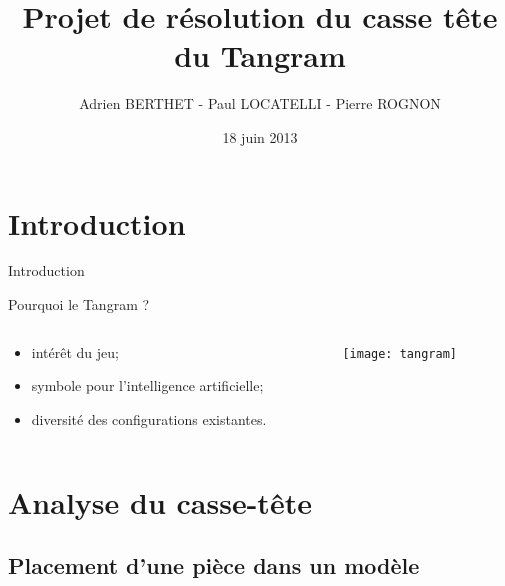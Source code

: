 \documentclass{beamer}
\title[Tangram]{Projet de résolution du casse tête du Tangram}
\author[]{Adrien BERTHET - Paul LOCATELLI - Pierre ROGNON}
\institute[UTBM]{Université de Technologies de Belfort-Montbéliard}
\date{18 juin 2013}
\begin{document}
\begin{frame}{}
	
	\maketitle	
	
\end{frame}

	\section*{Introduction}

\begin{frame}{Introduction}

	Pourquoi le Tangram ?
	\begin{columns}[c]
	
	\begin{column}{5cm}
   		\begin{itemize}
			\item intérêt du jeu;
			\item symbole pour l'intelligence artificielle;
			\item diversité des configurations existantes.
		\end{itemize}
  	\end{column}
	\begin{column}{5cm}
		\texttt{[image: tangram]}
  	\end{column}
	
	\end{columns}
    	
\end{frame}


	\section{Analyse du casse-t\^ete}
	
		\subsection{Placement d'une pièce dans un modèle}
\end{document}
